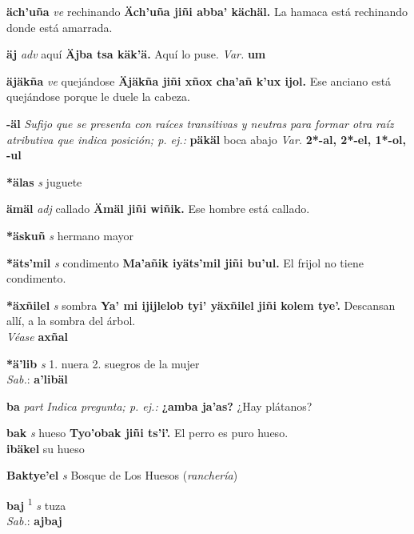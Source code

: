 \documentclass[10pt]{scrbook}
\newcommand{\entry}[1]{\textbf{#1}}
\newcommand{\alphaletter}[1]{\end{multicols}\addsec{#1}\begin{multicols}{2}}
\newcommand{\onedefinition}[1]{#1.}
\newcommand{\defsuperscript}[1]{\textsuperscript{#1}}
\newcommand{\nontranslationdef}[1]{\textit{#1}}
\newcommand{\partofspeech}[1]{\textit{#1}}
\newcommand{\spanishtranslation}[1]{#1}
\newcommand{\clarification}[1]{(\textit{#1})}
\newcommand{\cholexample}[1]{\textbf{#1}}
\newcommand{\exampletranslation}[1]{#1}
\newcommand{\dialectvariant}[1]{\\\textit{#1}:}
\newcommand{\dialectword}[1]{\textbf{#1}}
\newcommand{\alsosee}[1]{\\\textit{Véase} \textbf{#1}}
\newcommand{\secondaryentry}[1]{\\\textbf{#1}}
\newcommand{\secondtranslation}[1]{#1}
\newcommand{\variation}[1]{\textit{Var.} \textbf{#1}}
\begin{document}
\begin{multicols}{2}
\entry{äch'uña}
\partofspeech{ve}
\spanishtranslation{rechinando}
\cholexample{Äch'uña jiñi abba' kächäl.}
\exampletranslation{La hamaca está rechinando donde está amarrada.}

\entry{äj}
\partofspeech{adv}
\spanishtranslation{aquí}
\cholexample{Äjba tsa käk'ä.}
\exampletranslation{Aquí lo puse.}
\variation{um}

\entry{äjäkña}
\partofspeech{ve}
\spanishtranslation{quejándose}
\cholexample{Äjäkña jiñi xñox cha'añ k'ux ijol.}
\exampletranslation{Ese anciano está quejándose porque le duele la cabeza.}

\entry{-äl}
\nontranslationdef{Sufijo que se presenta con raíces transitivas y neutras para formar otra raíz atributiva que indica posición; p. ej.:}
\cholexample{päkäl}
\exampletranslation{boca abajo}
\variation{2*-al, 2*-el, 1*-ol, -ul}

\entry{*älas}
\partofspeech{s}
\spanishtranslation{juguete}

\entry{ämäl}
\partofspeech{adj}
\spanishtranslation{callado}
\cholexample{Ämäl jiñi wiñik.}
\exampletranslation{Ese hombre está callado.}

\entry{*äskuñ}
\partofspeech{s}
\spanishtranslation{hermano mayor}

\entry{*äts'mil}
\partofspeech{s}
\spanishtranslation{condimento}
\cholexample{Ma'añik iyäts'mil jiñi bu'ul.}
\exampletranslation{El frijol no tiene condimento.}

\entry{*äxñilel}
\partofspeech{s}
\spanishtranslation{sombra}
\cholexample{Ya' mi ijijlelob tyi' yäxñilel jiñi kolem tye'.}
\exampletranslation{Descansan allí, a la sombra del árbol.}
\alsosee{axñal}

\entry{*ä'lib}
\partofspeech{s}
\onedefinition{1}
\spanishtranslation{nuera}
\onedefinition{2}
\spanishtranslation{suegros de la mujer}
\dialectvariant{Sab.}
\dialectword{a'libäl}

\alphaletter{B}

\entry{ba}
\partofspeech{part}
\nontranslationdef{Indica pregunta; p. ej.:}
\cholexample{¿amba ja'as?}
\exampletranslation{¿Hay plátanos?}

\entry{bak}
\partofspeech{s}
\spanishtranslation{hueso}
\cholexample{Tyo'obak jiñi ts'i'.}
\exampletranslation{El perro es puro hueso.}
\secondaryentry{ibäkel}
\secondtranslation{su hueso}

\entry{Baktye'el}
\partofspeech{s}
\spanishtranslation{Bosque de Los Huesos}
\clarification{ranchería}

\entry{baj}
\defsuperscript{1}
\partofspeech{s}
\spanishtranslation{tuza}
\dialectvariant{Sab.}
\dialectword{ajbaj}


\end{multicols}
\end{document}
